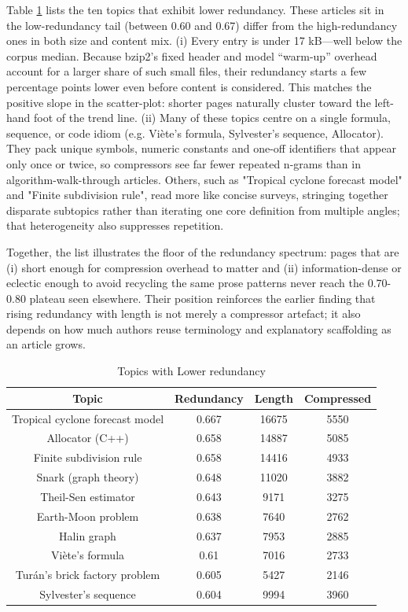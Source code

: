 Table \ref{tab:Lower-redundancy-of-topics} lists the ten topics that exhibit lower redundancy. These articles sit in the low-redundancy tail (between 0.60 and 0.67) differ from the high-redundancy ones in both size and content mix. (i)  Every entry is under 17 kB—well below the corpus median. Because bzip2's fixed header and model “warm-up” overhead account for a larger share of such small files, their redundancy starts a few percentage points lower even before content is considered. This matches the positive slope in the scatter-plot: shorter pages naturally cluster toward the left-hand foot of the trend line. (ii) Many of these topics centre on a single formula, sequence, or code idiom (e.g. Viète's formula, Sylvester's sequence, Allocator). They pack unique symbols, numeric constants and one-off identifiers that appear only once or twice, so compressors see far fewer repeated n-grams than in algorithm-walk-through articles. Others, such as "Tropical cyclone forecast model" and "Finite subdivision rule", read more like concise surveys, stringing together disparate subtopics rather than iterating one core definition from multiple angles; that heterogeneity also suppresses repetition.

Together, the list illustrates the floor of the redundancy spectrum: pages that are (i) short enough for compression overhead to matter and (ii) information-dense or eclectic enough to avoid recycling the same prose patterns never reach the 0.70-0.80 plateau seen elsewhere.  Their position reinforces the earlier finding that rising redundancy with length is not merely a compressor artefact; it also depends on how much authors reuse terminology and explanatory scaffolding as an article grows.

\begin{table}
\begin{centering}
\begin{tabular}{|c|c|c|c|}
\hline 
Topic & Redundancy & Length & Compressed \tabularnewline
\hline 
\hline 
Tropical cyclone forecast model & 0.667 & 16675 & 5550 \tabularnewline
\hline
Allocator (C++) & 0.658 & 14887 & 5085 \tabularnewline
\hline
Finite subdivision rule & 0.658 & 14416 & 4933 \tabularnewline
\hline
Snark (graph theory) & 0.648 & 11020 & 3882 \tabularnewline
\hline
Theil-Sen estimator & 0.643 & 9171 & 3275 \tabularnewline
\hline
Earth-Moon problem & 0.638 & 7640 & 2762 \tabularnewline
\hline
Halin graph & 0.637 & 7953 & 2885 \tabularnewline
\hline
Viète's formula & 0.61 & 7016 & 2733 \tabularnewline
\hline
Turán's brick factory problem & 0.605 & 5427 & 2146 \tabularnewline
\hline
Sylvester's sequence & 0.604 & 9994 & 3960 \tabularnewline
\hline 
\end{tabular}
\par\end{centering}
\caption{\label{tab:Lower-redundancy-of-topics}Topics with Lower redundancy}
\end{table}

